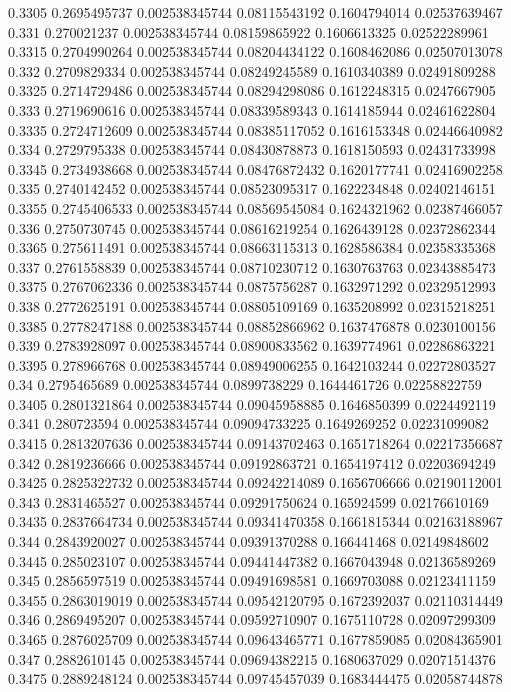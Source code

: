 {0.3305 0.2695495737 0.002538345744 0.08115543192 0.1604794014 0.02537639467
0.331 0.270021237 0.002538345744 0.08159865922 0.1606613325 0.02522289961
0.3315 0.2704990264 0.002538345744 0.08204434122 0.1608462086 0.02507013078
0.332 0.2709829334 0.002538345744 0.08249245589 0.1610340389 0.02491809288
0.3325 0.2714729486 0.002538345744 0.08294298086 0.1612248315 0.0247667905
0.333 0.2719690616 0.002538345744 0.08339589343 0.1614185944 0.02461622804
0.3335 0.2724712609 0.002538345744 0.08385117052 0.1616153348 0.02446640982
0.334 0.2729795338 0.002538345744 0.08430878873 0.1618150593 0.02431733998
0.3345 0.2734938668 0.002538345744 0.08476872432 0.1620177741 0.02416902258
0.335 0.2740142452 0.002538345744 0.08523095317 0.1622234848 0.02402146151
0.3355 0.2745406533 0.002538345744 0.08569545084 0.1624321962 0.02387466057
0.336 0.2750730745 0.002538345744 0.08616219254 0.1626439128 0.02372862344
0.3365 0.275611491 0.002538345744 0.08663115313 0.1628586384 0.02358335368
0.337 0.2761558839 0.002538345744 0.08710230712 0.1630763763 0.02343885473
0.3375 0.2767062336 0.002538345744 0.0875756287 0.1632971292 0.02329512993
0.338 0.2772625191 0.002538345744 0.08805109169 0.1635208992 0.02315218251
0.3385 0.2778247188 0.002538345744 0.08852866962 0.1637476878 0.0230100156
0.339 0.2783928097 0.002538345744 0.08900833562 0.1639774961 0.02286863221
0.3395 0.278966768 0.002538345744 0.08949006255 0.1642103244 0.02272803527
0.34 0.2795465689 0.002538345744 0.0899738229 0.1644461726 0.02258822759
0.3405 0.2801321864 0.002538345744 0.09045958885 0.1646850399 0.0224492119
0.341 0.280723594 0.002538345744 0.09094733225 0.1649269252 0.02231099082
0.3415 0.2813207636 0.002538345744 0.09143702463 0.1651718264 0.02217356687
0.342 0.2819236666 0.002538345744 0.09192863721 0.1654197412 0.02203694249
0.3425 0.2825322732 0.002538345744 0.09242214089 0.1656706666 0.02190112001
0.343 0.2831465527 0.002538345744 0.09291750624 0.165924599 0.02176610169
0.3435 0.2837664734 0.002538345744 0.09341470358 0.1661815344 0.02163188967
0.344 0.2843920027 0.002538345744 0.09391370288 0.166441468 0.02149848602
0.3445 0.285023107 0.002538345744 0.09441447382 0.1667043948 0.02136589269
0.345 0.2856597519 0.002538345744 0.09491698581 0.1669703088 0.02123411159
0.3455 0.2863019019 0.002538345744 0.09542120795 0.1672392037 0.02110314449
0.346 0.2869495207 0.002538345744 0.09592710907 0.1675110728 0.02097299309
0.3465 0.2876025709 0.002538345744 0.09643465771 0.1677859085 0.02084365901
0.347 0.2882610145 0.002538345744 0.09694382215 0.1680637029 0.02071514376
0.3475 0.2889248124 0.002538345744 0.09745457039 0.1683444475 0.02058744878
}
